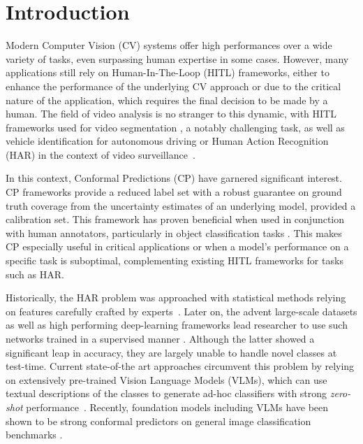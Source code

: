 \section{Introduction}
Modern Computer Vision (CV) systems offer high performances over a wide variety of tasks, even surpassing human expertise in some cases. However, many applications still rely on Human-In-The-Loop (HITL) frameworks, either to enhance the performance of the underlying CV approach or due to the critical nature of the application, which requires the final decision to be made by a human.
The field of video analysis is no stranger to this dynamic, with HITL frameworks used for video segmentation \cite{oh2019fast}, a notably challenging task, as well as vehicle identification for autonomous driving \cite{li2023human} or Human Action Recognition (HAR) in the context of video surveillance~\cite{stonebraker2020surveillance}. 

In this context, Conformal Predictions (CP) have garnered significant interest. CP frameworks provide a reduced label set with a robust guarantee on ground truth coverage from the uncertainty estimates of an underlying model, provided a calibration set. This framework has proven beneficial when used in conjunction with human annotators, particularly in object classification tasks \cite{straitouridesigning, cresswell2024conformal}. This makes CP especially useful in critical applications or when a model's performance on a specific task is suboptimal, complementing existing HITL frameworks for tasks such as HAR. 

Historically, the HAR problem was approached with statistical methods relying on features carefully crafted by experts~\cite{dollar2005behavior}. Later on, the advent large-scale datasets as well as high performing deep-learning frameworks lead researcher to use such networks trained in a supervised manner  \cite{wang2016temporal, feichtenhofer2019slowfast, jiang2019stm, arnab2021vivit}. Although the latter showed a significant leap in accuracy, they are largely unable to handle novel classes at test-time. Current state-of-the art approaches \cite{wang2021actionclip} circumvent this problem by relying on extensively pre-trained Vision Language Models (VLMs), which can use textual descriptions of the classes to generate ad-hoc classifiers with strong \textit{zero-shot} performance~\cite{radford_learning_2021}. Recently, foundation models including VLMs have been shown to be strong conformal predictors on general image classification benchmarks \cite{fillioux2024foundation}.

